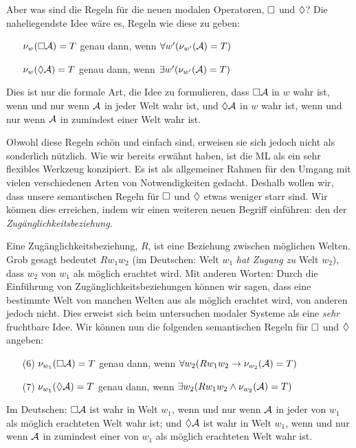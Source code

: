 Aber was sind die Regeln für die neuen modalen Operatoren, $\Box$ und $\Diamond$? Die naheliegendste Idee wäre es, Regeln wie diese zu geben:
\begin{itemize}
	\item[]$\nu_w(\Box \mathcal{A})=T$ genau dann, wenn $\forall w' (\nu_{w'}(\mathcal{A})=T)$
	\item[]$\nu_w(\Diamond \mathcal{A})=T$ genau dann, wenn $\exists w' (\nu_{w'}(\mathcal{A})=T)$
\end{itemize}
Dies ist nur die formale Art, die Idee zu formulieren, dass $\Box\mathcal{A}$ in $w$ wahr ist, wenn und nur wenn $\mathcal{A}$ in jeder Welt wahr ist, und $\Diamond\mathcal{A}$ in $w$ wahr ist, wenn und nur wenn $\mathcal{A}$ in zumindest einer Welt wahr ist.
 
Obwohl diese Regeln schön und einfach sind, erweisen sie sich jedoch nicht als sonderlich nützlich. Wie wir bereits erwähnt haben, ist die ML als ein sehr flexibles Werkzeug konzipiert. Es ist als allgemeiner Rahmen für den Umgang mit vielen verschiedenen Arten von Notwendigkeiten gedacht. Deshalb wollen wir, dass unsere semantischen Regeln für $\Box$ und $\Diamond$ etwas weniger starr sind. Wir können dies erreichen, indem wir einen weiteren neuen Begriff einführen: den der \emph{Zugänglichkeitsbeziehung}.

Eine Zugänglichkeitsbeziehung, $R$, ist eine Beziehung zwischen möglichen Welten. Grob gesagt bedeutet $Rw_1w_2$ (im Deutschen: Welt $w_1$ \emph{hat Zugang zu} Welt $w_2$), dass $w_2$ von $w_1$ als möglich erachtet wird. Mit anderen Worten: Durch die Einführung von Zugänglichkeitsbeziehungen können wir sagen, dass eine bestimmte Welt von manchen Welten aus als möglich erachtet wird, von anderen jedoch nicht. Dies erweist sich beim untersuchen modaler Systeme als eine \emph{sehr} fruchtbare Idee. Wir können nun die folgenden semantischen Regeln für $\Box$ und $\Diamond$ angeben:
\begin{itemize}
	\item[(6)]$\nu_{w_1}(\Box \mathcal{A})=T$ genau dann, wenn $\forall w_2 (Rw_1w_2\rightarrow \nu_{w_2}(\mathcal{A})=T)$
	\item[(7)]$\nu_{w_1}(\Diamond \mathcal{A})=T$ genau dann, wenn $\exists w_2 (Rw_1w_2\wedge \nu_{w_2}(\mathcal{A})=T)$
\end{itemize}
Im Deutschen: $\Box\mathcal{A}$ ist wahr in Welt $w_1$, wenn und nur wenn $\mathcal{A}$ in jeder von $w_1$ als möglich erachteten Welt wahr ist; und $\Diamond\mathcal{A}$ ist wahr in Welt $w_1$, wenn und nur wenn $\mathcal{A}$ in zumindest einer von $w_1$ als möglich erachteten Welt wahr ist.

